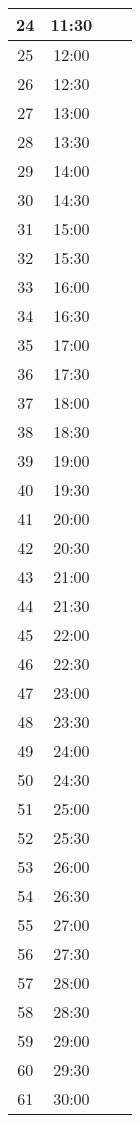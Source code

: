 \documentclass[11pt]{article}
\begin{document}
\begin{table}[htbp]
\begin{tabular}{|c|c|c|c|}
        \hline
        24 & 11:30 & & \\
        \hline
        25 & 12:00 & & \\
        \hline
        26 & 12:30 & & \\
        \hline
        27 & 13:00 & & \\
        \hline
        28 & 13:30 & & \\
        \hline
        29 & 14:00 & & \\
        \hline
        30 & 14:30 & & \\
        \hline
        31 & 15:00 & & \\
        \hline
        32 & 15:30 & & \\
        \hline
        33 & 16:00 & & \\
        \hline
        34 & 16:30 & & \\
        \hline
        35 & 17:00 & & \\
        \hline
        36 & 17:30 & & \\
        \hline
        37 & 18:00 & & \\
        \hline
        38 & 18:30 & & \\
        \hline
        39 & 19:00 & & \\
        \hline
        40 & 19:30 & & \\
        \hline
        41 & 20:00 & & \\
        \hline
        42 & 20:30 & & \\
        \hline
        43 & 21:00 & & \\
        \hline
        44 & 21:30 & & \\
        \hline
        45 & 22:00 & & \\
        \hline
        46 & 22:30 & & \\
        \hline
        47 & 23:00 & & \\
        \hline
        48 & 23:30 & & \\
        \hline
        49 & 24:00 & & \\
        \hline
        50 & 24:30 & & \\
        \hline
        51 & 25:00 & & \\
        \hline
        52 & 25:30 & & \\
        \hline
        53 & 26:00 & & \\
        \hline
        54 & 26:30 & & \\
        \hline
        55 & 27:00 & & \\
        \hline
        56 & 27:30 & & \\
        \hline
        57 & 28:00 & & \\
        \hline
        58 & 28:30 & & \\
        \hline
        59 & 29:00 & & \\
        \hline
        60 & 29:30 & & \\
        \hline
        61 & 30:00 & & \\
        \hline
    \end{tabular}
\end{table}
\end{document}
